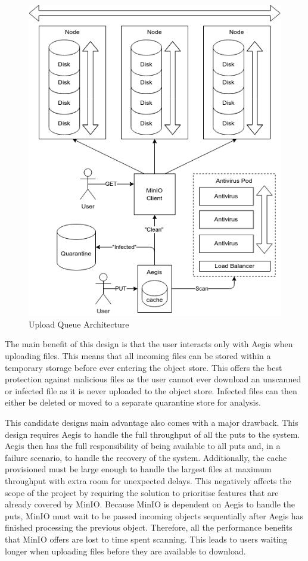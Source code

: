 \documentclass[12pt, conference, final, a4paper, onecolumn, compsoc]{IEEEtran}
\begin{document}
\begin{figure}
  \centering \includegraphics[scale=.4]{diagrams/upload-queue.png}
  \caption{Upload Queue Architecture}
  \label{fig:uploadQueueArch}
\end{figure}

The main benefit of this design is that the user interacts only with Aegis when
uploading files. This means that all incoming files can be stored within a
temporary storage before ever entering the object store. This offers the best
protection against malicious files as the user cannot ever download an unscanned
or infected file as it is never uploaded to the object store. Infected files can
then either be deleted or moved to a separate quarantine store for analysis.

This candidate designs main advantage also comes with a major drawback. This
design requires Aegis to handle the full throughput of all the puts to the
system. Aegis then has the full responsibility of being available to all puts
and, in a failure scenario, to handle the recovery of the system. Additionally,
the cache provisioned must be large enough to handle the largest files at
maximum throughput with extra room for unexpected delays. This negatively
affects the scope of the project by requiring the solution to prioritise
features that are already covered by MinIO. Because MinIO is dependent on Aegis
to handle the puts, MinIO must wait to be passed incoming objects sequentially
after Aegis has finished processing the previous object. Therefore, all the
performance benefits that MinIO offers are lost to time spent scanning. This
leads to users waiting longer when uploading files before they are available to
download.
\end{document}
